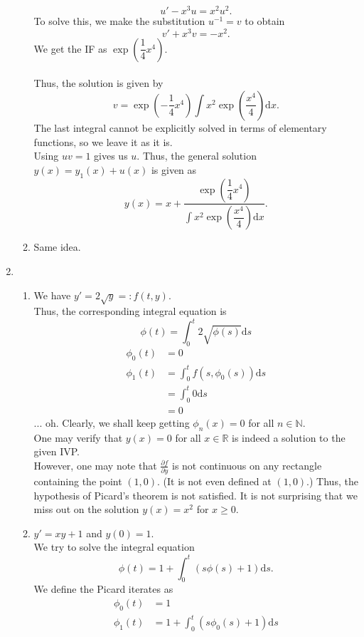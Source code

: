 \documentclass{article}
\begin{document}
\begin{enumerate}[label = Q.\arabic*.]
\begin{enumerate}[label = (\roman*)]
		\[u' - x^3u = x^2u^2.\]
		To solve this, we make the substitution $u^{-1} = v$ to obtain
		\[v' + x^3v = -x^2.\]
		We get the IF as $\exp\left(\dfrac{1}{4}x^4\right).$\\~\\
		Thus, the solution is given by
		\[v = \exp\left(-\dfrac{1}{4}x^4\right)\int x^2\exp\left(\dfrac{x^4}{4}\right) \text{d}x.\]
		The last integral cannot be explicitly solved in terms of elementary functions, so we leave it as it is.\\
		Using $uv = 1$ gives us $u.$ Thus, the general solution $y(x) = y_1(x) + u(x)$ is given as
		\[y(x) = x + \dfrac{\exp\left(\dfrac{1}{4}x^4\right)}{\displaystyle\int x^2\exp\left(\dfrac{x^4}{4}\right) \text{d}x}.\]
		\item Same idea.
	\end{enumerate}
	\item 
	\begin{enumerate}[label = (\roman*)] 
		\item We have $y' = 2\sqrt{y} =: f(t, y).$\\
		Thus, the corresponding integral equation is
		\[\phi(t) = \int_{0}^{t} 2\sqrt{\phi(s)} \text{d}s\]
		\begin{align*} 
			\phi_0(t) &= 0\\
			\phi_1(t) &= \int_{0}^{t} f(s, \phi_0(s)) \text{d}s\\
			&= \int_{0}^{t} 0 \text{d}s\\
			&= 0
		\end{align*}
		... oh. Clearly, we shall keep getting $\phi_n(x) = 0$ for all $n \in \mathbb{N}.$\\
		One may verify that $y(x) = 0$ for all $x \in \mathbb{R}$ is indeed a solution to the given IVP.\\
		However, one may note that $\frac{\partial f}{\partial y}$ is not continuous on any rectangle containing the point $(1, 0).$ (It is not even defined at $(1, 0)$.) Thus, the hypothesis of Picard's theorem is not satisfied. It is not surprising that we miss out on the solution $y(x) = x^2$ for $x \ge 0.$
		\item $y' = xy + 1$ and $y(0) = 1.$\\
		We try to solve the integral equation
		\[\phi(t) = 1 + \int_{0}^{t} (s\phi(s) + 1) \text{d}s.\]
		We define the Picard iterates as
		\begin{align*} 
			\phi_0(t) &= 1\\
			\phi_1(t) &= 1 + \int_{0}^{t} (s\phi_0(s) + 1) \text{d}s\\

\end{align*}
\end{enumerate}
\end{enumerate}
\end{document}

